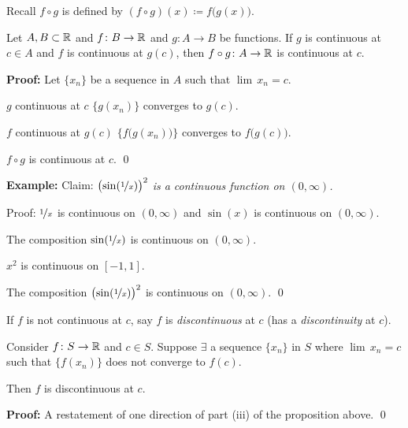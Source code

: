 \documentclass[10pt,aspectratio=169]{beamer}
\begin{document}
\begin{frame}

Recall $f \circ g$ is defined by
$(f \circ g)(x) \coloneqq f\bigl(g(x)\bigr)$.
\pause

\begin{proposition}
Let $A, B \subset {\mathbb{R}}$ and $f \colon B \to {\mathbb{R}}$ and $g \colon A \to B$ be
functions.  If $g$ is continuous at $c \in A$ and
$f$ is continuous at $g(c)$, then $f \circ g \colon A \to {\mathbb{R}}$ is continuous
at $c$.
\end{proposition}

\pause
\textbf{Proof:}
Let $\{ x_n \}$ be a sequence in $A$ such that $\lim\, x_n = c$.

\pause
$g$ continuous at $c$ \wthus $\bigl\{ g(x_n) \bigr\}$ converges to $g(c)$.

\pause
$f$ continuous at $g(c)$ \wthus $\bigl\{ f\bigl(g(x_n)\bigr) \bigr\}$ converges to $f\bigl(g(c)\bigr)$.

\pause
\thus \quad $f \circ g$ is continuous at $c$.
\qed

\pause
\medskip

\textbf{Example:}
Claim: \emph{${\bigl(\sin(\nicefrac{1}{x})\bigr)}^2$ is a continuous
function on $(0,\infty)$.}

\pause
\medskip

Proof: $\nicefrac{1}{x}$ is continuous on $(0,\infty)$
and $\sin(x)$ is continuous on $(0,\infty)$.

\pause
\thus \quad The composition $\sin(\nicefrac{1}{x})$ is continuous on
$(0,\infty)$.

\pause
$x^2$ is continuous on $[-1,1]$.

\pause
\thus \quad
The composition ${\bigl(\sin(\nicefrac{1}{x})\bigr)}^2$ is continuous on $(0,\infty)$.
\qed

\end{frame}

\begin{frame}
If $f$ is not continuous at $c$,
say $f$ is \emph{discontinuous} at $c$ (has a \emph{discontinuity} at $c$).

\pause
\begin{proposition}
Consider $f \colon S \to {\mathbb{R}}$ and $c \in S$.  Suppose 
$\exists$ a sequence $\{ x_n \}$ in $S$ where $\lim\, x_n = c$
such that $\bigl\{ f(x_n) \bigr\}$ does not converge to $f(c)$.

\pause
Then $f$ is 
discontinuous at $c$.
\end{proposition}

\pause
\textbf{Proof:} A restatement of one direction of part (iii) of the
proposition above.
\qed

\end{frame}
\end{document}
